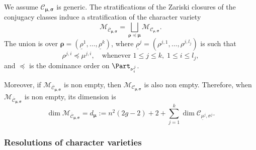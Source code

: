 \begin{proposition}\label{prop_strat}
We assume $\mathcal{C}_{\boldsymbol{\mu},\boldsymbol{\sigma}}$ is generic. The stratifications of the Zariski closures of the conjugacy classes induce a stratification of the character variety
\[
\mathcal{M}_{\overline{\mathcal{C}}_{\boldsymbol{\mu},\boldsymbol{\sigma}}}=\bigsqcup_{\boldsymbol{\rho}\preceq\boldsymbol{\mu}} \mathcal{M}_{\mathcal{C}_{\boldsymbol{\rho},\boldsymbol{\sigma}}}.
\]
The union is over $\boldsymbol{\rho} =(\underline{\rho}^{1},\dots,\underline{\rho}^{k})$, where $\underline{\rho}^j=\left(\rho^{j,1},\dots,\rho^{j,l_j}\right)$ is such that
\[
\rho^{j,i}\preceq \mu^{j,i},\quad\text{whenever }1\le j \le k,\; 1\le i \le l_j,
\]
and $\preceq$ is the dominance order on $\Part_{\nu^j_i}$.

Moreover, if $\mathcal{M}_{\overline{\mathcal{C}}_{\boldsymbol{\mu},\boldsymbol{\sigma}}}$ is non empty, then $\mathcal{M}_{\mathcal{C}_{\boldsymbol{\mu},\boldsymbol{\sigma}}}$ is also non empty. Therefore, when $\mathcal{M}_{\overline{\mathcal{C}}_{\boldsymbol{\mu},\boldsymbol{\sigma}}}$ is non empty, its dimension is
\begin{equation}\label{eq_dim_MC}
\dim \mathcal{M}_{\overline{\mathcal{C}}_{\boldsymbol{\mu},\boldsymbol{\sigma}}} = d_{\boldsymbol{\mu}}:=n^2 (2 g-2) +2 +\sum_{j=1}^k \dim \mathcal{C}_{\underline{\mu}^j,\sigma^j }.
\end{equation}
\end{proposition}

\subsubsection{Resolutions of character varieties}\label{subsect_resolution_character}

